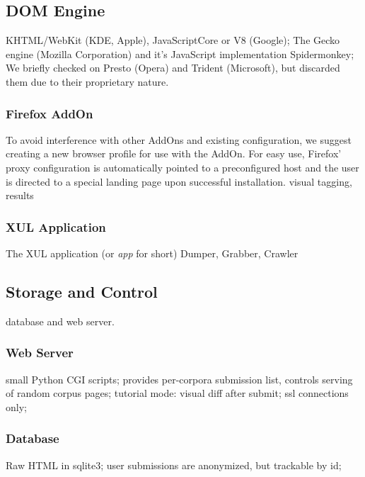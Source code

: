 \subsection{DOM Engine}

KHTML/WebKit (KDE, Apple), JavaScriptCore or V8 (Google);
The Gecko engine (Mozilla Corporation) and it's JavaScript implementation Spidermonkey;
We briefly checked on Presto (Opera) and Trident (Microsoft), but discarded them due to their proprietary nature.

\subsubsection{Firefox AddOn}

To avoid interference with other AddOns and existing configuration, we suggest creating a new browser profile for use with the AddOn.
For easy use, Firefox' proxy configuration is automatically pointed to a preconfigured host and the user is directed to a special landing page upon successful installation.
visual tagging, results

\subsubsection{XUL Application}

The XUL application (or \textit{app} for short) 
Dumper, Grabber, Crawler


\subsection{Storage and Control}

database and web server. 

\subsubsection{Web Server}

small Python CGI scripts;
provides per-corpora submission list,
controls serving of random corpus pages;
tutorial mode: visual diff after submit;
ssl connections only;

\subsubsection{Database}

Raw HTML in sqlite3;
user submissions are anonymized, but trackable by id;

